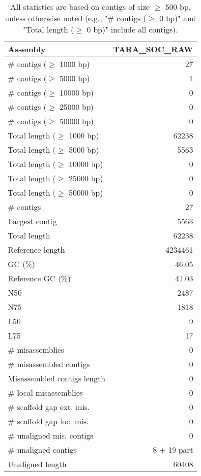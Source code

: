 \documentclass[12pt,a4paper]{article}
\begin{document}
\begin{table}[ht]
\begin{center}
\caption{All statistics are based on contigs of size $\geq$ 500 bp, unless otherwise noted (e.g., "\# contigs ($\geq$ 0 bp)" and "Total length ($\geq$ 0 bp)" include all contigs).}
\begin{tabular}{|l*{1}{|r}|}
\hline
Assembly & TARA\_SOC\_RAW \\ \hline
\# contigs ($\geq$ 1000 bp) & 27 \\ \hline
\# contigs ($\geq$ 5000 bp) & 1 \\ \hline
\# contigs ($\geq$ 10000 bp) & 0 \\ \hline
\# contigs ($\geq$ 25000 bp) & 0 \\ \hline
\# contigs ($\geq$ 50000 bp) & 0 \\ \hline
Total length ($\geq$ 1000 bp) & 62238 \\ \hline
Total length ($\geq$ 5000 bp) & 5563 \\ \hline
Total length ($\geq$ 10000 bp) & 0 \\ \hline
Total length ($\geq$ 25000 bp) & 0 \\ \hline
Total length ($\geq$ 50000 bp) & 0 \\ \hline
\# contigs & 27 \\ \hline
Largest contig & 5563 \\ \hline
Total length & 62238 \\ \hline
Reference length & 4234461 \\ \hline
GC (\%) & 46.05 \\ \hline
Reference GC (\%) & 41.03 \\ \hline
N50 & 2487 \\ \hline
N75 & 1818 \\ \hline
L50 & 9 \\ \hline
L75 & 17 \\ \hline
\# misassemblies & 0 \\ \hline
\# misassembled contigs & 0 \\ \hline
Misassembled contigs length & 0 \\ \hline
\# local misassemblies & 0 \\ \hline
\# scaffold gap ext. mis. & 0 \\ \hline
\# scaffold gap loc. mis. & 0 \\ \hline
\# unaligned mis. contigs & 0 \\ \hline
\# unaligned contigs & 8 + 19 part \\ \hline
Unaligned length & 60408 \\ \hline

\end{tabular}
\end{center}
\end{table}
\end{document}
